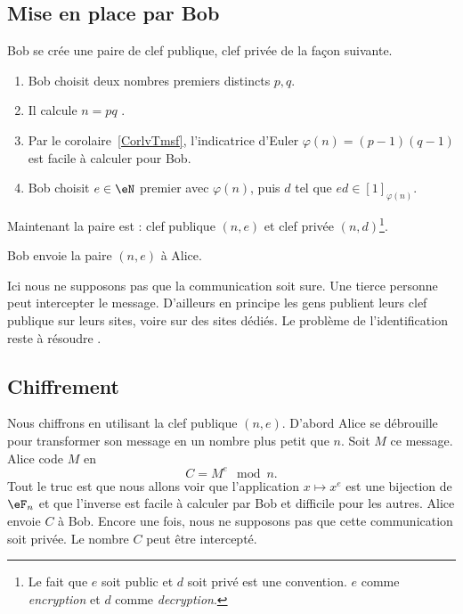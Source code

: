 \subsection{Mise en place par Bob}

Bob se crée une paire de clef publique, clef privée de la façon suivante.
\begin{enumerate}
    \item
        Bob choisit deux nombres premiers distincts \( p,q\).
    \item
        Il calcule \( n=pq\) .
    \item
        Par le corolaire~\ref{CorlvTmsf}, l'indicatrice d'Euler \( \varphi(n)=(p-1)(q-1)\) est facile à calculer pour Bob.
    \item
        Bob choisit \( e\in \eN\) premier avec \( \varphi(n)\), puis \( d\) tel que \( ed\in[1]_{\varphi(n)}\).
\end{enumerate}
Maintenant la paire est : clef publique \( (n,e)\) et clef privée \( (n,d)\)\footnote{Le fait que \( e\) soit public et \( d\) soit privé est une convention. \( e\) comme  \emph{encryption} et \( d\) comme \emph{decryption}.}.

Bob envoie la paire \( (n,e)\) à Alice.

\begin{remark}
    Ici nous ne supposons pas que la communication soit sure. Une tierce personne peut intercepter le message. D'ailleurs en principe les gens publient leurs clef publique sur leurs sites, voire sur des sites dédiés. Le problème de l'identification reste à résoudre .
\end{remark}

\subsection{Chiffrement}

Nous chiffrons en utilisant la clef publique \( (n,e)\). D'abord Alice se débrouille pour transformer son message en un nombre plus petit que \( n\). Soit \( M\) ce message. Alice code \( M\) en
\begin{equation}
    C=M^e\mod n.
\end{equation}
Tout le truc est que nous allons voir que l'application \( x\mapsto x^e\) est une bijection de \( \eF_n\) et que l'inverse est facile à calculer par Bob et difficile pour les autres. Alice envoie \( C\) à Bob. Encore une fois, nous ne supposons pas que cette communication soit privée. Le nombre \( C\) peut être intercepté.

